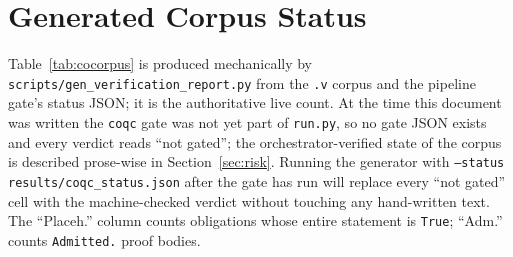 \documentclass[11pt]{article}
\theoremstyle{definition}
\begin{document}
\section{Generated Corpus Status}\label{sec:status}

Table~\ref{tab:cocorpus} is produced mechanically by
\texttt{scripts/gen\_verification\_report.py} from the \texttt{.v} corpus
and the pipeline gate's status JSON; it is the authoritative live count.
At the time this document was written the \texttt{coqc} gate was not yet
part of \texttt{run.py}, so no gate JSON exists and every verdict reads
``not gated''; the orchestrator-verified state of the corpus is described
prose-wise in Section~\ref{sec:risk}. Running the generator with
\texttt{--status results/coqc\_status.json} after the gate has run will
replace every ``not gated'' cell with the machine-checked verdict without
touching any hand-written text. The ``Placeh.'' column counts obligations
whose entire statement is \texttt{True}; ``Adm.'' counts
\texttt{Admitted.} proof bodies.
\end{document}

